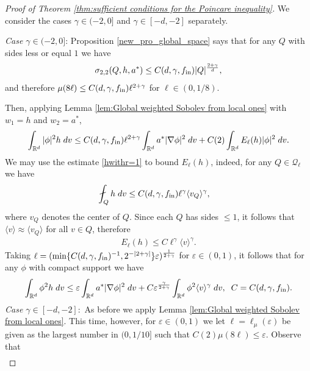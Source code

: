 \documentclass[12pt,american]{amsart}
\numberwithin{equation}{section}
\theoremstyle{plain}
\theoremstyle{definition}                  %
\def\astar{{a^*}}
\def\fin{f_{\textnormal{in}}}
\begin{document}
\begin{proof}[Proof of Theorem  \ref{thm:sufficient conditions for the Poincare inequality}] We consider the cases $\gamma \in (-2,0]$ and $\gamma \in [-d,-2]$ separately.
	
\emph{Case $\gamma \in (-2,0]$}:  Proposition \ref{new_pro_global_space} says that for any $Q$ with sides less or equal $1$ we have
  \begin{align*}
  \sigma_{2,2}(Q,h,a^*) \leq C(d,\gamma,\fin)|Q|^{\frac{2+\gamma}{d}},
  \end{align*}
  and therefore  $\mu(8\ell) \leq  C(d,\gamma,\fin)\ell^{2+\gamma}$ for $\ell \in (0,1/8)$.
  
  Then, applying Lemma \ref{lem:Global weighted Sobolev from local ones} with $w_1 = h$ and $w_2 = \astar$,
  \begin{align*}
    \int_{\mathbb{R}^d}|\phi|^2 h\;dv \leq C(d,\gamma,\fin)\ell^{2+\gamma}\int_{\mathbb{R}^d} \astar|\nabla \phi|^2\;dv+C(2)\int_{\mathbb{R}^d}E_\ell(h)|\phi|^2\;dv. 
  \end{align*}
  We may use the estimate \eqref{hwithr=1} to bound $E_{\ell}(h)$, indeed, for any $Q\in \mathcal{Q}_\ell$ we have
  \begin{align*}
    \fint_{Q} h\;dv &\leq C(d,\gamma,\fin)\ell^\gamma \langle v_Q\rangle^\gamma ,
  \end{align*}
  where $v_Q$ denotes the center of $Q$. Since each $Q$ has sides $\leq 1$, it follows that $\langle v\rangle \approx \langle v_Q\rangle$ for all $v\in Q$, therefore
  \begin{align*}
    E_{\ell}(h) \leq C\ell^\gamma\langle v\rangle^\gamma	  .
  \end{align*}	  
  Taking $\ell = (\min\{C(d,\gamma,\fin)^{-1},2^{-|2+\gamma|}\}\varepsilon )^{\frac{1}{2+\gamma}}$ for $\varepsilon \in(0,1)$, it follows that for any $\phi$ with compact support we have
  \begin{align*}	
    \int_{\mathbb{R}^d} \phi^2 h\;dv \leq \varepsilon \int_{\mathbb{R}^d}a^*|\nabla \phi|^2\;dv + C\varepsilon^{\frac{\gamma}{2+\gamma}}\int_{\mathbb{R}^d} \phi^2\langle v\rangle^\gamma\;dv,\;\;C=C(d,\gamma,\fin).
  \end{align*}	
  \noindent \emph{Case $\gamma \in [-d,-2]:$} As before we apply Lemma \ref{lem:Global weighted Sobolev from local ones}. This time, however, for $\varepsilon \in (0,1)$ we let $\ell = \ell_\mu(\varepsilon)$ be given as the largest number in $(0,1/10]$ such that $C(2)\mu(8 \ell) \leq \varepsilon$. Observe that 
  \begin{align*}

\end{align*}
\end{proof}
\end{document}
